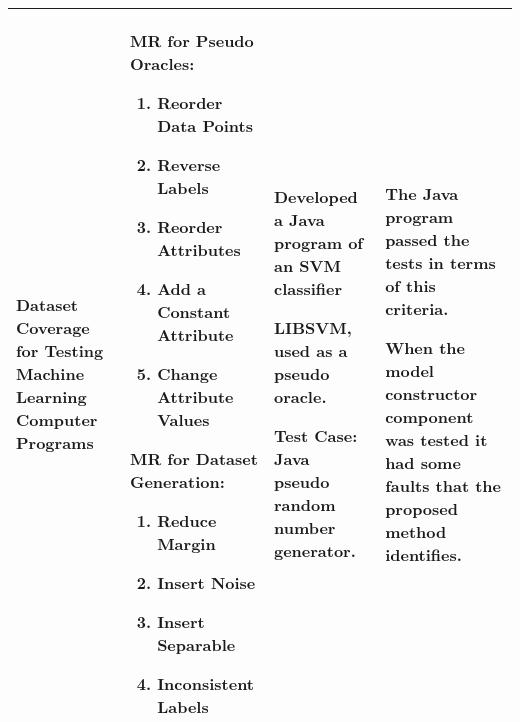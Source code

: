 \begin{singlespace}
\begin{longtable}[c]{| p{3cm} | p{5cm} | p{3cm} | p{3cm} |}
  \hline

  Dataset Coverage for Testing Machine Learning Computer Programs            &
  MR for Pseudo Oracles:
  \begin{enumerate}
   \item Reorder Data Points
   \item Reverse Labels
   \item Reorder Attributes
   \item Add a Constant Attribute
   \item Change Attribute Values
  \end{enumerate}
  \smallskip
  MR for Dataset Generation:
  \begin{enumerate}
   \item Reduce Margin
   \item Insert Noise
   \item Insert Separable
   \item Inconsistent Labels
  \end{enumerate}                                                  &
  Developed a Java program of an SVM classifier\par\medskip
  LIBSVM, used as a pseudo oracle.\par\medskip
  Test Case: Java pseudo random number generator.                            &
  The Java program passed the tests in terms of this criteria. \par\medskip
  When the model constructor component was tested it had some faults that the proposed method identifies.                      \\

  \hline


\end{longtable}
\end{singlespace}
